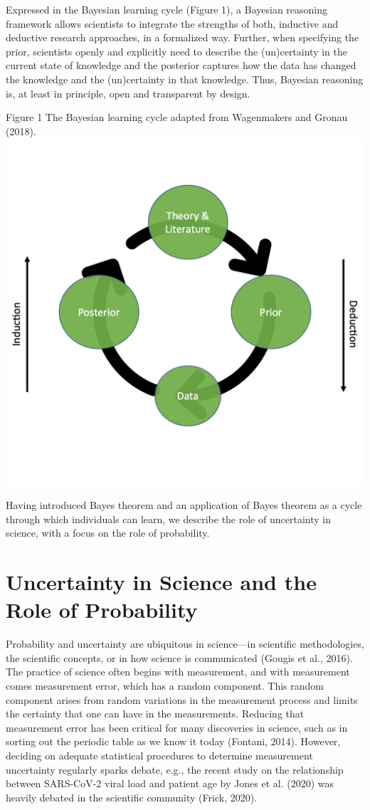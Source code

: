 \documentclass[man]{apa7}
\begin{document}
Expressed in the Bayesian learning cycle (Figure 1), a Bayesian reasoning framework allows scientists to integrate the strengths of both, inductive and deductive research approaches, in a formalized way. Further, when specifying the prior, scientists openly and explicitly need to describe the (un)certainty in the current state of knowledge and the posterior captures how the data has changed the knowledge and the (un)certainty in that knowledge. Thus, Bayesian reasoning is, at least in principle, open and transparent by design.

Figure 1
The Bayesian learning cycle adapted from Wagenmakers and Gronau (2018).
\includegraphics[scale = .75]{learning.png}

Having introduced Bayes theorem and an application of Bayes theorem as a cycle through which individuals can learn, we describe the role of uncertainty in science, with a focus on the role of probability.

\section{Uncertainty in Science and the Role of Probability}

Probability and uncertainty are ubiquitous in science—in scientific methodologies, the scientific concepts, or in how science is communicated (Gougis et al., 2016). The practice of science often begins with measurement, and with measurement comes measurement error, which has a random component. This random component arises from random variations in the measurement process and limits the certainty that one can have in the measurements. Reducing that measurement error has been critical for many discoveries in science, such as in sorting out the periodic table as we know it today (Fontani, 2014). However, deciding on adequate statistical procedures to determine measurement uncertainty regularly sparks debate, e.g., the recent study on the relationship between SARS-CoV-2 viral load and patient age by Jones et al. (2020) was heavily debated in the scientific community (Frick, 2020).
\end{document}
